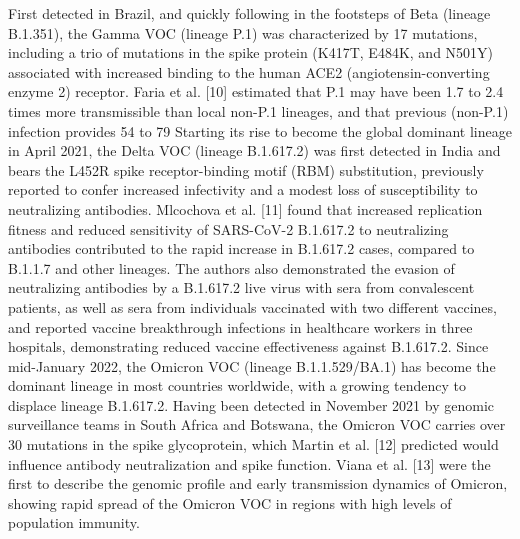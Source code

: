 First detected in Brazil, and quickly following in the footsteps of Beta (lineage B.1.351), the Gamma VOC (lineage P.1) was characterized by 17 mutations, including a trio of mutations in the spike protein (K417T, E484K, and N501Y) associated with increased binding to the human ACE2 (angiotensin-converting enzyme 2) receptor. Faria et al. [10] estimated that P.1 may have been 1.7 to 2.4 times more transmissible than local non-P.1 lineages, and that previous (non-P.1) infection provides 54 to 79%
Starting its rise to become the global dominant lineage in April 2021, the Delta VOC (lineage B.1.617.2) was first detected in India and bears the L452R spike receptor-binding motif (RBM) substitution, previously reported to confer increased infectivity and a modest loss of susceptibility to neutralizing antibodies. Mlcochova et al. [11] found that increased replication fitness and reduced sensitivity of SARS-CoV-2 B.1.617.2 to neutralizing antibodies contributed to the rapid increase in B.1.617.2 cases, compared to B.1.1.7 and other lineages. The authors also demonstrated the evasion of neutralizing antibodies by a B.1.617.2 live virus with sera from convalescent patients, as well as sera from individuals vaccinated with two different vaccines, and reported vaccine breakthrough infections in healthcare workers in three hospitals, demonstrating reduced vaccine effectiveness against B.1.617.2.
Since mid-January 2022, the Omicron VOC (lineage B.1.1.529/BA.1) has become the dominant lineage in most countries worldwide, with a growing tendency to displace lineage B.1.617.2. Having been detected in November 2021 by genomic surveillance teams in South Africa and Botswana, the Omicron VOC carries over 30 mutations in the spike glycoprotein, which Martin et al. [12] predicted would influence antibody neutralization and spike function. Viana et al. [13] were the first to describe the genomic profile and early transmission dynamics of Omicron, showing rapid spread of the Omicron VOC in regions with high levels of population immunity.
